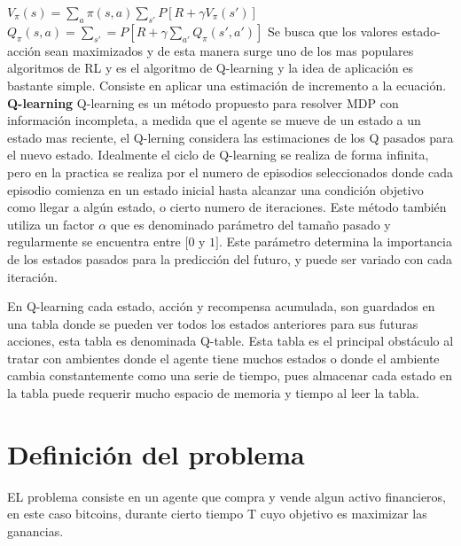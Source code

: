 \documentclass[12pt,letterpaper]{article}
\begin{document}
{$V_{\pi}(s) = \sum\limits_{a} \pi(s,a)  \sum\limits_{s'} P[R + \gamma V_{\pi} (s')]$
\newline
\newline
$Q_{\pi}(s,a) = \sum\limits_{s'} = P[R + \gamma \sum\limits_{a'} Q_{\pi}(s',a')] $ 
\newline
\newline 
Se busca que los valores estado-acción sean maximizados y de esta manera surge uno de los mas populares algoritmos de RL y es el algoritmo de Q-learning y la idea de aplicación es bastante simple. Consiste en aplicar una estimación de incremento a la ecuación. 
\newline
\newline 
\textbf{Q-learning}
\newline
\newline 
Q-learning es un método propuesto para resolver MDP con información incompleta, a medida que el agente se mueve de un estado a un estado mas reciente, el Q-lerning considera las estimaciones de los Q pasados para el nuevo estado. 
Idealmente el ciclo de Q-learning se realiza de forma infinita, pero en la practica se realiza por el numero de episodios seleccionados donde cada episodio comienza en un estado inicial hasta alcanzar una condición objetivo como llegar a algún estado, o cierto numero de iteraciones. 
Este método también utiliza un factor $\alpha$ que es denominado parámetro del tamaño pasado y regularmente se encuentra entre $[0$ y $1]$. Este parámetro determina la importancia de los estados pasados para la predicción del futuro, y puede ser variado con cada iteración. 

En Q-learning cada estado, acción y recompensa acumulada, son guardados en una tabla donde se pueden ver todos los estados anteriores para sus futuras acciones, esta tabla es denominada Q-table. 
Esta tabla es el principal obstáculo al tratar con ambientes donde el agente tiene muchos estados o donde el ambiente cambia constantemente como una serie de tiempo, pues almacenar cada estado en la tabla puede requerir mucho espacio de memoria y tiempo al leer la tabla. 
 
\section{Definici\'on del problema }

EL problema consiste en un agente que compra y vende algun activo financieros, en este caso bitcoins, durante cierto tiempo T cuyo objetivo es maximizar las ganancias. 

}
\end{document}

